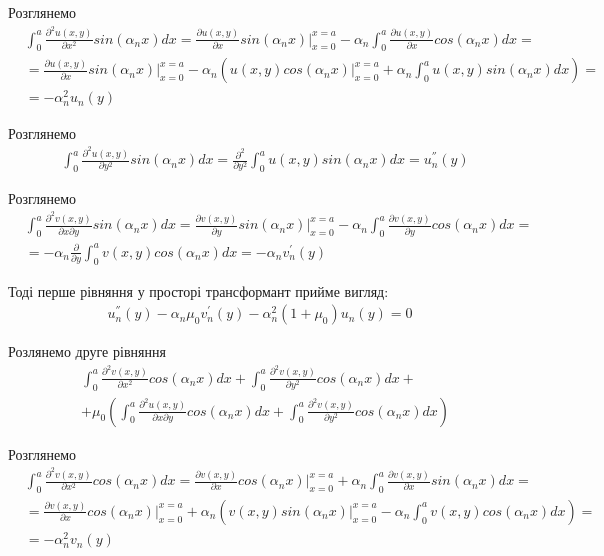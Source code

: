 \documentclass[a4paper,14pt]{extarticle}
\numberwithin{equation}{section}
\begin{document}
Розглянемо
\begin{align*}
    &\int_{0}^{a} \frac{\partial^2 u(x,y)}{\partial x^2} sin(\alpha_n x)dx = \frac{\partial u(x,y)}{\partial x} sin(\alpha_n x) |_{x=0}^{x=a} - \alpha_n \int_{0}^{a} \frac{\partial u(x,y)}{\partial x} cos(\alpha_n x)dx = \\
    &= \frac{\partial u(x,y)}{\partial x} sin(\alpha_n x) |_{x=0}^{x=a} - \alpha_n \left( u(x,y) cos(\alpha_n x) |_{x=0}^{x=a} + \alpha_n \int_{0}^{a} u(x,y) sin(\alpha_n x) dx \right) = \\
    &= -\alpha_n^2 u_n(y)
\end{align*}

Розглянемо
\begin{align*}
    &\int_{0}^{a} \frac{\partial^2 u(x,y)}{\partial y^2} sin(\alpha_n x)dx = \frac{\partial^2}{\partial y^2} \int_{0}^{a} u(x,y) sin(\alpha_n x)dx = u_n^{''}(y)
\end{align*}

Розглянемо
\begin{align*}
    &\int_{0}^{a} \frac{\partial^2 v(x,y)}{\partial x \partial y} sin(\alpha_n x) dx = \frac{\partial v(x,y)}{\partial y} sin(\alpha_n x) |_{x=0}^{x=a} - \alpha_n \int_{0}^{a} \frac{\partial v(x,y)}{\partial y} cos(\alpha_n x) dx = \\
    &= -\alpha_n \frac{\partial}{\partial y} \int_{0}^{a} v(x,y) cos(\alpha_n x) dx = -\alpha_n v_n^{'}(y)
\end{align*}

Тоді перше рівняння у просторі трансформант прийме вигляд:
\begin{align*}
    u_n^{''}(y) - \alpha_n \mu_0 v_n^{'}(y) - \alpha_n^2 (1 + \mu_0) u_n(y) = 0
\end{align*}

Розлянемо друге рівняння
\begin{align*}
    &\int_{0}^{a} \frac{\partial^2 v(x,y)}{\partial x^2} cos(\alpha_n x)dx + \int_{0}^{a} \frac{\partial^2 v(x,y)}{\partial y^2} cos(\alpha_n x)dx + \\ 
    & + \mu_0 \left( \int_{0}^{a} \frac{\partial^2 u(x,y)}{\partial x \partial y} cos(\alpha_n x)dx +  \int_{0}^{a} \frac{\partial^2 v(x,y)}{\partial y^2} cos(\alpha_n x) dx\right)
\end{align*}

Розглянемо
\begin{align*}
    &\int_{0}^{a} \frac{\partial^2 v(x,y)}{\partial x^2} cos(\alpha_n x)dx = \frac{\partial v(x,y)}{\partial x} cos(\alpha_n x) |_{x=0}^{x=a} + \alpha_n \int_{0}^{a} \frac{\partial v(x,y)}{\partial x} sin(\alpha_n x) dx = \\
    &=\frac{\partial v(x,y)}{\partial x} cos(\alpha_n x) |_{x=0}^{x=a} + \alpha_n \left(v(x,y) sin(\alpha_n x)|_{x=0}^{x=a} - \alpha_n \int_{0}^{a} v(x,y) cos(\alpha_n x) dx  \right) = \\
    &= -\alpha_n^2 v_n(y)
\end{align*}
\end{document}
